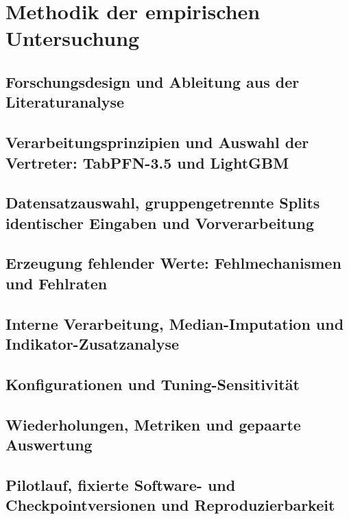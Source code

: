 \section{Methodik der empirischen Untersuchung}\label{sec:methodik}

\subsection{Forschungsdesign und Ableitung aus der Literaturanalyse}\label{sec:methodik-design}

\subsection{Verarbeitungsprinzipien und Auswahl der Vertreter: TabPFN-3.5 und LightGBM}\label{sec:methodik-vertreter}

\subsection{Datensatzauswahl, gruppengetrennte Splits identischer Eingaben und Vorverarbeitung}\label{sec:methodik-daten}

\subsection{Erzeugung fehlender Werte: Fehlmechanismen und Fehlraten}\label{sec:methodik-masken}

\subsection{Interne Verarbeitung, Median-Imputation und Indikator-Zusatzanalyse}\label{sec:methodik-behandlungen}

\subsection{Konfigurationen und Tuning-Sensitivität}\label{sec:methodik-tuning}

\subsection{Wiederholungen, Metriken und gepaarte Auswertung}\label{sec:methodik-auswertung}

\subsection{Pilotlauf, fixierte Software- und Checkpointversionen und Reproduzierbarkeit}\label{sec:methodik-repro}
